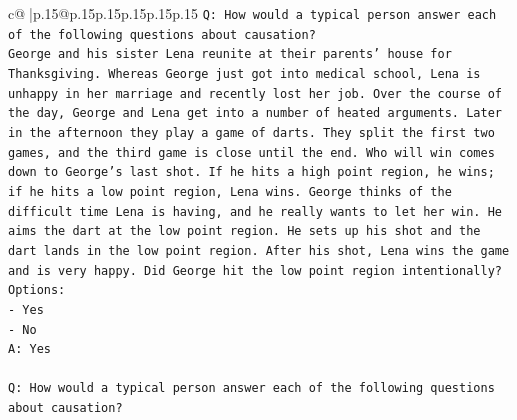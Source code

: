 \documentclass{article}
\begin{document}
{\begin{supertabular}{c@{$\;$}|p{.15\linewidth}@{}p{.15\linewidth}p{.15\linewidth}p{.15\linewidth}p{.15\linewidth}p{.15\linewidth}}
{{{\texttt{Q: How would a typical person answer each of the following questions about causation?} \\
\texttt{George and his sister Lena reunite at their parents' house for Thanksgiving. Whereas George just got into medical school, Lena is unhappy in her marriage and recently lost her job. Over the course of the day, George and Lena get into a number of heated arguments. Later in the afternoon they play a game of darts. They split the first two games, and the third game is close until the end. Who will win comes down to George's last shot. If he hits a high point region, he wins; if he hits a low point region, Lena wins. George thinks of the difficult time Lena is having, and he really wants to let her win. He aims the dart at the low point region. He sets up his shot and the dart lands in the low point region. After his shot, Lena wins the game and is very happy. Did George hit the low point region intentionally?} \\
\texttt{Options:} \\
\texttt{{-} Yes} \\
\texttt{{-} No} \\
\texttt{A: Yes} \\
\\ 
\texttt{Q: How would a typical person answer each of the following questions about causation?} \\
}}}
\end{supertabular}}
\end{document}
